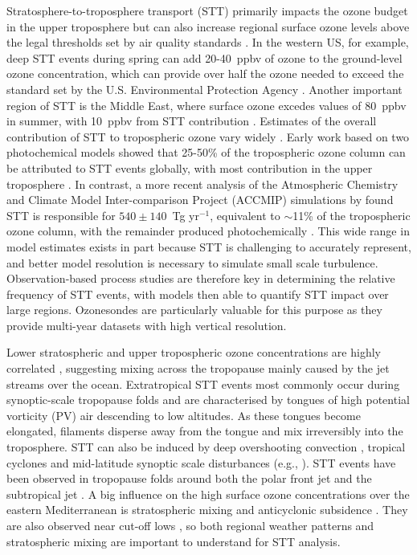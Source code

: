 \documentclass[acp, manuscript]{copernicus} %
\begin{document}
  Stratosphere-to-troposphere transport (STT) primarily impacts the ozone budget in the upper troposphere but can also increase regional surface ozone levels above the legal thresholds set by air quality standards \citep{Danielson1968, Lelieveld2009, Lefohn2011, Langford2012, Zhang2014, Lin2015}.
  In the western US, for example, deep STT events during spring can add 20-40~ppbv of ozone to the ground-level ozone concentration, which can provide over half the ozone needed to exceed the standard set by the U.S. Environmental Protection Agency \citep{Lin2012, Lin2015}.
  Another important region of STT is the Middle East, where surface ozone excedes values of 80~ppbv in summer, with 10~ppbv from STT contribution \citep{Lelieveld2009}.
  Estimates of the overall contribution of STT to tropospheric ozone vary widely \citep[e.g.,][]{Galani2003, Stohl2003, Stevenson2006, Lefohn2011}.
  Early work based on two photochemical models showed that 25-50\% of the tropospheric ozone column can be attributed to STT events globally, with most contribution in the upper troposphere \citep{Stohl2003}.
  In contrast, a more recent analysis of the Atmospheric Chemistry and Climate Model Inter-comparison Project (ACCMIP) simulations by \citet{Young2013} found STT is responsible for $540\pm140$~Tg yr$^{-1}$, equivalent to $\sim$11\% of the tropospheric ozone column, with the remainder produced photochemically \citep{Monks2015}.
  This wide range in model estimates exists in part because STT is challenging to accurately represent, and better model resolution is necessary to simulate small scale turbulence.
  Observation-based process studies are therefore key in determining the relative frequency of STT events, with models then able to quantify STT impact over large regions.
  Ozonesondes are particularly valuable for this purpose as they provide multi-year datasets with high vertical resolution.

  Lower stratospheric and upper tropospheric ozone concentrations are highly correlated \citep{Terao2008}, suggesting mixing across the tropopause mainly caused by the jet streams over the ocean.
  Extratropical STT events most commonly occur during synoptic-scale tropopause folds \citep{Sprenger2003, Tang2012, Frey2015} and are characterised by tongues of high potential vorticity (PV) air descending to low altitudes.
  As these tongues become elongated, filaments disperse away from the tongue and mix irreversibly into the troposphere.
  STT can also be induced by deep overshooting convection \citep{Frey2015}, tropical cyclones \citep{Das2016} and mid-latitude synoptic scale disturbances (e.g., \citet{Stohl2003, Mihalikova2012}). 
  STT events have been observed in tropopause folds around both the polar front jet \citep{Vaughan1994, Beekmann1997} and the subtropical jet \citep{Baray2000}.
  A big influence on the high surface ozone concentrations over the eastern Mediterranean is stratospheric mixing and anticyclonic subsidence \citep{Zanis2014}. 
  They are also observed near cut-off lows \citep{Price1993, Wirth1995}, so both regional weather patterns and stratospheric mixing are important to understand for STT analysis.
\end{document}
